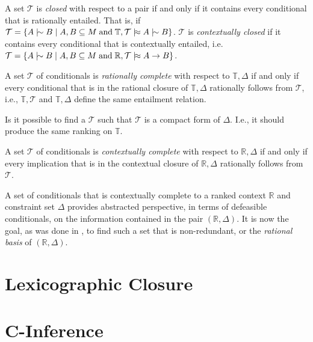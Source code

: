 \begin{definition}
	A set $\mathcal{T}$ is \emph{closed} with respect to a pair if and only if it contains every conditional that is
	rationally entailed. That is, if
	$\mathcal{T}= \{A \twiddle B \mid A,B \subseteq M \tand \mathbb{T},\mathcal{T}\dentails A \twiddle B\}$. $\mathcal{T}$
	is \emph{contextually closed} if it contains every conditional that is contextually entailed, i.e.
	$\mathcal{T}= \{A \twiddle B \mid A,B \subseteq M \tand \mathbb{R}, \mathcal{T}\dentails A \rightarrow B\}$.
\end{definition}

\begin{definition}
	A set $\mathcal{T}$ of conditionals is \emph{rationally complete} with respect to $\mathbb{T},\Delta$ if and only if
	every conditional that is in the rational closure of $\mathbb{T}, \Delta$ rationally follows from $\mathcal{T}$, i.e.,
	$\mathbb{T},\mathcal{T}$ and $\mathbb{T}, \Delta$ define the same entailment relation.
\end{definition}

Is it possible to find a $\mathcal{T}$ such that $\mathcal{T}$ is a compact form of $\Delta$. I.e., it should produce the
same ranking on $\mathbb{T}$.

\begin{definition}
	A set $\mathcal{T}$ of conditionals is \emph{contextually complete} with respect to $\mathbb{R}, \Delta$ if and only
	if every implication that is in the contextual closure of $\mathbb{R}, \Delta$ rationally follows from $\mathcal{T}$.
\end{definition}

A set of conditionals that is contextually complete to a ranked context $\mathbb{R}$ and constraint set $\Delta$
provides abstracted perspective, in terms of defeasible conditionals, on the information contained in the pair
$(\mathbb{R}, \Delta )$. It is now the goal, as was done in , to find such a set that
is non-redundant, or the \textit{rational basis} of $(\mathbb{R},\Delta)$.

\section{Lexicographic Closure}


\section{C-Inference}
